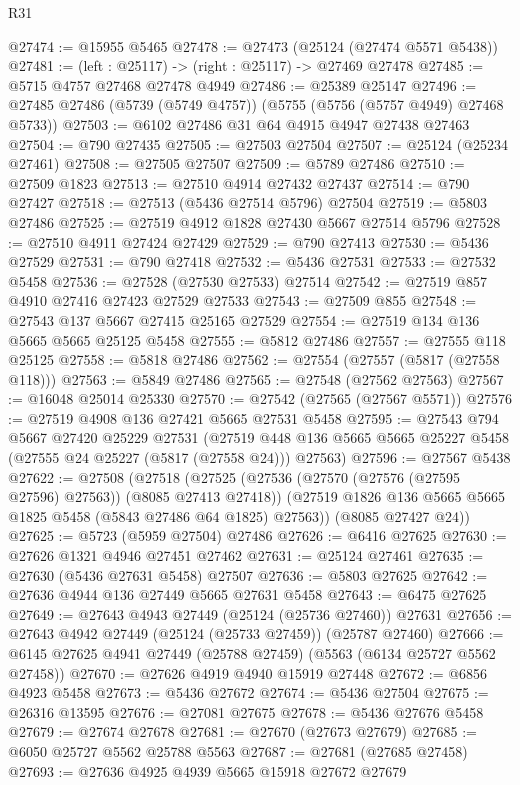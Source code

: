 \begin{lexlean}{R31}
\begin{coremodule}
@27474 := @15955 @5465
@27478 := @27473 (@25124 (@27474 @5571 @5438))
@27481 := (left : @25117) -> (right : @25117) -> @27469 @27478
@27485 := @5715 @4757 @27468 @27478 @4949
@27486 := @25389 @25147
@27496 := @27485 @27486 (@5739 (@5749 @4757)) (@5755 (@5756 (@5757 @4949) @27468 @5733))
@27503 := @6102 @27486 @31 @64 @4915 @4947 @27438 @27463
@27504 := @790 @27435
@27505 := @27503 @27504
@27507 := @25124 (@25234 @27461)
@27508 := @27505 @27507
@27509 := @5789 @27486
@27510 := @27509 @1823
@27513 := @27510 @4914 @27432 @27437
@27514 := @790 @27427
@27518 := @27513 (@5436 @27514 @5796) @27504
@27519 := @5803 @27486
@27525 := @27519 @4912 @1828 @27430 @5667 @27514 @5796
@27528 := @27510 @4911 @27424 @27429
@27529 := @790 @27413
@27530 := @5436 @27529
@27531 := @790 @27418
@27532 := @5436 @27531
@27533 := @27532 @5458
@27536 := @27528 (@27530 @27533) @27514
@27542 := @27519 @857 @4910 @27416 @27423 @27529 @27533
@27543 := @27509 @855
@27548 := @27543 @137 @5667 @27415 @25165 @27529
@27554 := @27519 @134 @136 @5665 @5665 @25125 @5458
@27555 := @5812 @27486
@27557 := @27555 @118 @25125
@27558 := @5818 @27486
@27562 := @27554 (@27557 (@5817 (@27558 @118)))
@27563 := @5849 @27486
@27565 := @27548 (@27562 @27563)
@27567 := @16048 @25014 @25330
@27570 := @27542 (@27565 (@27567 @5571))
@27576 := @27519 @4908 @136 @27421 @5665 @27531 @5458
@27595 := @27543
    @794
    @5667
    @27420
    @25229
    @27531
    (@27519 @448 @136 @5665 @5665 @25227 @5458 (@27555 @24 @25227 (@5817 (@27558 @24))) @27563)
@27596 := @27567 @5438
@27622 := @27508
    (@27518
      (@27525
        (@27536 (@27570 (@27576 (@27595 @27596) @27563)) (@8085 @27413 @27418))
        (@27519 @1826 @136 @5665 @5665 @1825 @5458 (@5843 @27486 @64 @1825) @27563))
      (@8085 @27427 @24))
@27625 := @5723 (@5959 @27504) @27486
@27626 := @6416 @27625
@27630 := @27626 @1321 @4946 @27451 @27462
@27631 := @25124 @27461
@27635 := @27630 (@5436 @27631 @5458) @27507
@27636 := @5803 @27625
@27642 := @27636 @4944 @136 @27449 @5665 @27631 @5458
@27643 := @6475 @27625
@27649 := @27643 @4943 @27449 (@25124 (@25736 @27460)) @27631
@27656 := @27643 @4942 @27449 (@25124 (@25733 @27459)) (@25787 @27460)
@27666 := @6145 @27625 @4941 @27449 (@25788 @27459) (@5563 (@6134 @25727 @5562 @27458))
@27670 := @27626 @4919 @4940 @15919 @27448
@27672 := @6856 @4923 @5458
@27673 := @5436 @27672
@27674 := @5436 @27504
@27675 := @26316 @13595
@27676 := @27081 @27675
@27678 := @5436 @27676 @5458
@27679 := @27674 @27678
@27681 := @27670 (@27673 @27679)
@27685 := @6050 @25727 @5562 @25788 @5563
@27687 := @27681 (@27685 @27458)
@27693 := @27636 @4925 @4939 @5665 @15918 @27672 @27679

\end{coremodule}
\end{lexlean}
